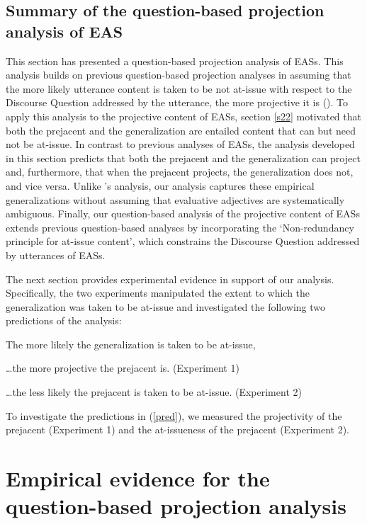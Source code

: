 \documentclass[11pt,fleqn]{article}
\newcommand{\6}{\mbox{$[\hspace*{-.6mm}[$}}
\newcommand{\9}{\mbox{$]\hspace*{-.6mm}]$}}
\newcommand{\citepos}[1]{\citeauthor{#1}'s \citeyear{#1}}
\begin{document}
\subsection{Summary of the question-based projection analysis of EAS}

This section has presented a question-based projection analysis of EASs. This analysis builds on previous question-based projection analyses in assuming that the more likely utterance content is taken to be not at-issue with respect to the Discourse Question addressed by the utterance,  the more projective it is (\citealt{best-question,brst-ar,tbd-variability}). To apply this analysis to the projective content of EASs, section \ref{s22} motivated that both the prejacent and the generalization are entailed content that can but need not be at-issue. In contrast to previous analyses of EASs, the analysis developed in this section predicts that both the prejacent and the generalization can project and, furthermore, that when the prejacent projects, the generalization does not, and vice versa. Unlike \citepos{karttunen-etal2014} analysis, our analysis captures these empirical generalizations without assuming that evaluative adjectives are systematically ambiguous. Finally, our question-based analysis of the projective content of EASs extends previous question-based analyses by incorporating the `Non-redundancy principle for at-issue content', which constrains the Discourse Question addressed by utterances of EASs.

The next section provides experimental evidence in support of our analysis. Specifically, the two experiments manipulated the extent to which the generalization was taken to be at-issue and investigated the following two predictions of the analysis:

\begin{exe}
\ex\label{pred} The more likely the generalization is taken to be at-issue,
\begin{xlist}
\ex \ldots the more projective the prejacent is. (Experiment 1)

\ex \ldots the less likely the prejacent is taken to be at-issue. (Experiment 2)

\end{xlist}
\end{exe}
To investigate the predictions in (\ref{pred}), we measured the projectivity of the prejacent (Experiment 1) and the at-issueness of the prejacent (Experiment 2).

\section{Empirical evidence for the question-based projection analysis}\label{s3}
\end{document}
